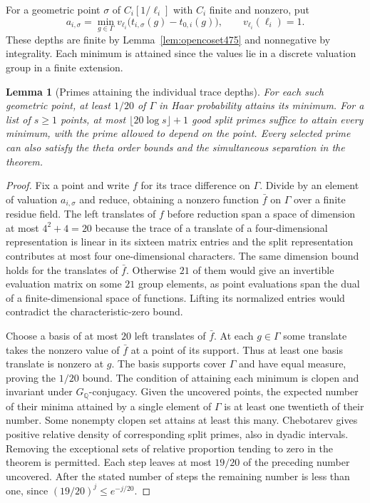 \documentclass[a4paper,11pt]{article}
\newtheorem{lemma}[proposition]{Lemma}
\theoremstyle{definition}
\theoremstyle{remark}
\numberwithin{equation}{section}
\begin{document}
For a geometric point \(\sigma\) of
\(C_i[1/\ell_i]\) with \(C_i\) finite and nonzero, put
\[
 a_{i,\sigma}=\min_{g\in\Gamma}
 v_{\ell_i}\bigl(t_{i,\sigma}(g)-t_{0,i}(g)\bigr),
 \qquad v_{\ell_i}(\ell_i)=1 .
\]
These depths are finite by Lemma~\ref{lem:opencoset475} and
nonnegative by integrality. Each minimum is attained since the
values lie in a discrete valuation group in a finite extension.

\begin{lemma}[Primes attaining the individual trace depths]\leavevmode
\label{lem:mintraces484}
For each such geometric point, at least \(1/20\) of \(\Gamma\)
in Haar probability attains its minimum. For a list of \(s\ge1\)
points, at most \(\lfloor20\log s\rfloor+1\) good split primes
suffice to attain every minimum, with the prime allowed to depend
on the point. Every selected prime can also satisfy the theta
order bounds and the simultaneous separation in the theorem.
\end{lemma}
\begin{proof}
Fix a point and write \(f\) for its trace difference on \(\Gamma\).
Divide by an element of valuation \(a_{i,\sigma}\) and reduce,
obtaining a nonzero function \(\bar f\) on \(\Gamma\) over a
finite residue field. The left translates of \(f\) before
reduction span a space of dimension at most \(4^2+4=20\)
because the trace of a translate of a four-dimensional representation
is linear in its sixteen matrix entries and the split
representation contributes at most four one-dimensional
characters. The same dimension bound holds for the translates
of \(\bar f\). Otherwise \(21\) of them would give an invertible
evaluation matrix on some \(21\) group elements, as point
evaluations span the dual of a finite-dimensional space of
functions. Lifting its normalized entries would contradict the
characteristic-zero bound.

Choose a basis of at most \(20\) left translates of \(\bar f\).
At each \(g\in\Gamma\) some translate takes the nonzero value of
\(\bar f\) at a point of its support. Thus at least one basis
translate is nonzero at \(g\). The basis supports cover \(\Gamma\)
and have equal measure, proving the \(1/20\) bound.
The condition of attaining each minimum is clopen and invariant
under \(G_{\mathbb Q}\)-conjugacy. Given the uncovered points,
the expected number of their minima attained by a single element
of \(\Gamma\) is at least one twentieth of their number.
Some nonempty clopen set attains at least this many.
Chebotarev gives positive relative density of corresponding
split primes, also in dyadic intervals. Removing the exceptional
sets of relative proportion tending to zero in the theorem is
permitted. Each step leaves at most \(19/20\) of the preceding
number uncovered. After the stated number of steps the remaining
number is less than one, since \((19/20)^j\le e^{-j/20}\).
\end{proof}
\end{document}
